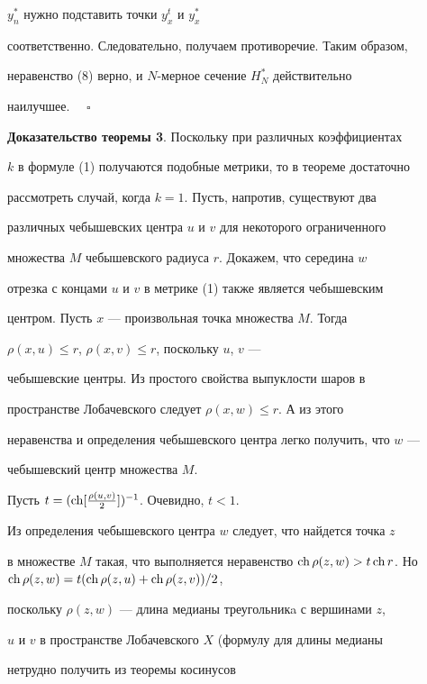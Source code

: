 $y^{*}_{n}$ нужно подставить точки $y^{t}_{x}$ и $y^{*}_{x}$


соответственно. Следовательно, получаем противоречие. Таким образом,


неравенство (8) верно, и $N$-мерное сечение $H^{*}_{N}$ действительно


наилучшее. $\quad\square$


\medskip





{\bf Доказательство теоремы 3}. Поскольку при различных коэффициентах


$k$ в формуле (1) получаются подобные метрики, то в теореме достаточно


рассмотреть случай, когда $k = 1$. Пусть, напротив, существуют два


различных чебышевских центра $u$ и $v$ для некоторого ограниченного


множества $M$ чебышевского радиуса $r$. Докажем, что середина $w$


отрезка с концами $u$ и $v$ в метрике (1) также является чебышевским


центром. Пусть $x$ --- произвольная точка множества $M$. Тогда


$\rho(x,u) \leq r$, $\rho(x,v) \leq r$, поскольку $u$, $v$ ---


чебышевские центры. Из простого свойства выпуклости шаров в


пространстве Лобачевского следует $\rho(x,w) \leq r$. А из этого


неравенства и определения чебышевского центра легко получить, что $w$ ---


чебышевский центр множества $M$.





Пусть $t = (\operatorname{ch}[\frac{\rho(u,v)}{2}])^{-1}$. Очевидно, $t < 1$.


Из определения чебышевского центра $w$ следует, что найдется точка $z$


в множестве $M$ такая, что выполняется неравенство $\ch \rho(z,w) >


t\ch r$. Но $\ch \rho(z,w) = t(\ch \rho(z,u) + \ch \rho(z,v))/2$,


поскольку $\rho(z,w)$ --- длина медианы треугольникa с вершинами $z$,


$u$ и $v$ в пространстве Лобачевского $X$ (формулу для длины медианы 


нетрудно получить из теоремы косинусов


